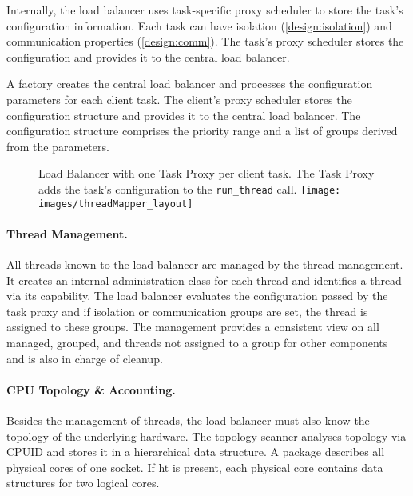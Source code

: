 Internally, the load balancer uses task-specific proxy scheduler to store the
task's configuration information.
Each task can have isolation (\ref{design:isolation}) and communication
properties (\ref{design:comm}).
The task's proxy scheduler stores the configuration and provides it to the
central load balancer.

A factory creates the central load balancer and processes the configuration
parameters for each client task.
The client's proxy scheduler stores the configuration structure and provides it
to the central load balancer.
The configuration structure comprises the priority range and a list of
groups derived from the parameters.

\begin{figure}[h!]
  \setcapindent*{1em}
  \begin{captionbeside}
    {Load Balancer with one Task Proxy per client task.
      The Task Proxy adds the task's configuration to the \texttt{run\_thread}
    call.}
  \texttt{[image: images/threadMapper\_layout]}
\end{captionbeside}
  \label{state:figbalancer_proxy}
\end{figure}


\paragraph{Thread Management.}
All threads known to the load balancer are managed by the thread management.
It creates an internal administration class for each thread and identifies a
thread via its capability.
The load balancer evaluates the configuration passed by the task proxy and
if isolation or communication groups are set, the thread is assigned to these
groups.
The management provides a consistent view on all managed, grouped, and threads
not assigned to a group for other components and is also in charge of cleanup.


\paragraph{CPU Topology \& Accounting.}
Besides the management of threads, the load balancer must also know the
topology of the underlying hardware.
The topology scanner analyses topology via CPUID and stores it in a
hierarchical data structure.
A package describes all physical cores of one socket.
If \gls{ht} is present, each physical core contains data structures for
two logical cores.

